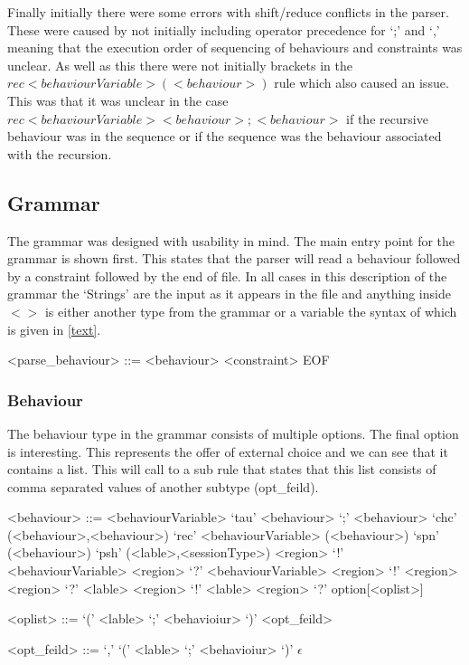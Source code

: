 Finally initially there were some errors with shift/reduce conflicts in the parser. These were caused by not initially including operator precedence for `;' and `,' meaning that the execution order of sequencing of behaviours and constraints was unclear. As well as this there were not initially brackets in the $rec <behaviourVariable> (<behaviour>)$ rule which also caused an issue. This was that it was unclear in the case $rec <behaviourVariable> <behaviour> ; <behaviour>  $ if the recursive behaviour was in the sequence or if the sequence was the behaviour associated with the recursion. 

\subsection{Grammar} \label{gram}

The grammar was designed with usability in mind. The main entry point for the grammar is shown first. This states that the parser will read a behaviour followed by a constraint followed by the end of file. In all cases in this description of the grammar the `Strings' are the input as it appears in the file and anything inside $< >$ is either another type from the grammar or a variable the syntax of which is given in \ref{text}.

\begin{grammar}

<parse_behaviour> ::= <behaviour> <constraint> EOF

\end{grammar}

\subsubsection{Behaviour}

The behaviour type in the grammar consists of multiple options. The final option is interesting. This represents the offer of external choice and we can see that it contains a list. This will call to a sub rule that states that this list consists of comma separated values of another subtype (opt_feild). 

\begin{grammar}
<behaviour> ::= <behaviourVariable>
\alt `tau'
\alt <behaviour> `;' <behaviour>
\alt `chc' (<behaviour>,<behaviour>)
\alt `rec' <behaviourVariable> (<behaviour>)
\alt `spn' (<behaviour>)
\alt `psh' (<lable>,<sessionType>)
\alt <region> `!' <behaviourVariable>
\alt <region> `?' <behaviourVariable>
\alt <region> `!' <region>
\alt <region> `?' <lable>
\alt <region> `!' <lable>
\alt <region> `?' option[<oplist>]

<oplist> ::= `(' <lable> `;' <behavioiur> `)' <opt_feild>

<opt_feild> ::= `,' `(' <lable> `;' <behavioiur> `)'
\alt $\epsilon$

\end{grammar}

